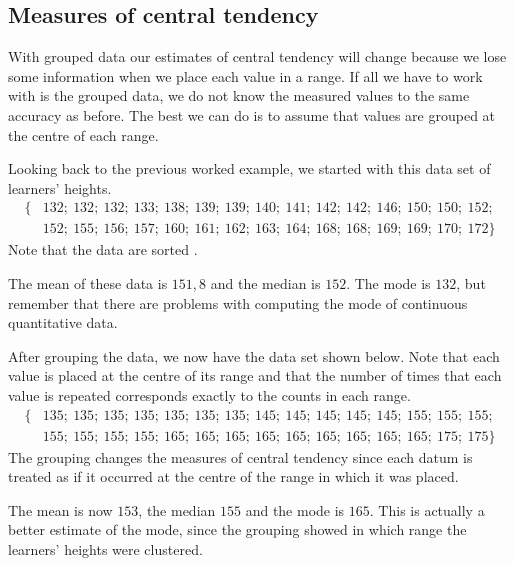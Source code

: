 \subsection*{Measures of central tendency}
With grouped data our estimates of central tendency will change
because we lose some information when we place each value in a range.
If all we have to work with is the grouped data, we do not know the
measured values to the same accuracy as before. The best we can do is
to assume that values are grouped at the centre of each range.\par

Looking back to the previous worked example, we started with this data
set of learners' heights.
\begin{align*}
  \{&132;\ 132;\ 132;\ 133;\ 138;\ 139;\ 139;\ 140;\ 141;\ 142;\ 142;\ 146;\ 150;\ 150;\ 152;\\
    &152;\ 155;\ 156;\ 157;\ 160;\ 161;\ 162;\ 163;\ 164;\ 168;\ 168;\ 169;\ 169;\ 170;\ 172\}
\end{align*}
Note that the data are sorted .

The mean of these data is $151,8$ and the median is $152$. The mode is
$132$, but remember that there are problems with computing the mode of
continuous quantitative data.\par

After grouping the data, we now have the data set shown below. Note
that each value is placed at the centre of its range and that the
number of times that each value is repeated corresponds exactly to the
counts in each range.
\begin{align*}
  \{&135;\ 135;\ 135;\ 135;\ 135;\ 135;\ 135;\ 145;\ 145;\ 145;\ 145;\ 145;\ 155;\ 155;\ 155;\\
    &155;\ 155;\ 155;\ 155;\ 165;\ 165;\ 165;\ 165;\ 165;\ 165;\ 165;\ 165;\ 165;\ 175;\ 175\}
\end{align*}
The grouping changes the measures of central tendency since each datum
is treated as if it occurred at the centre of the range in which it was
placed.\par

The mean is now $153$, the median $155$ and the mode is $165$. This is
actually a better estimate of the mode, since the grouping showed in
which range the learners' heights were clustered.


